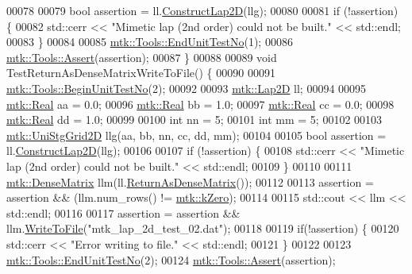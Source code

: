 \begin{DoxyCode}
00078 
00079   \textcolor{keywordtype}{bool} assertion = ll.\hyperlink{classmtk_1_1Lap2D_a188ee8fee643463affca7de2884711b1}{ConstructLap2D}(llg);
00080 
00081   \textcolor{keywordflow}{if} (!assertion) \{
00082     std::cerr << \textcolor{stringliteral}{"Mimetic lap (2nd order) could not be built."} << std::endl;
00083   \}
00084 
00085   \hyperlink{classmtk_1_1Tools_ad8cf0085133dd40c913fe195bc5b9694}{mtk::Tools::EndUnitTestNo}(1);
00086   \hyperlink{classmtk_1_1Tools_aa311fada9255627d06c56b1e4fedce9e}{mtk::Tools::Assert}(assertion);
00087 \}
00088 
00089 \textcolor{keywordtype}{void} TestReturnAsDenseMatrixWriteToFile() \{
00090 
00091   \hyperlink{classmtk_1_1Tools_a26ee906d28523378522a75e25c3a4e19}{mtk::Tools::BeginUnitTestNo}(2);
00092 
00093   \hyperlink{classmtk_1_1Lap2D}{mtk::Lap2D} ll;
00094 
00095   \hyperlink{group__c01-roots_gac080bbbf5cbb5502c9f00405f894857d}{mtk::Real} aa = 0.0;
00096   \hyperlink{group__c01-roots_gac080bbbf5cbb5502c9f00405f894857d}{mtk::Real} bb = 1.0;
00097   \hyperlink{group__c01-roots_gac080bbbf5cbb5502c9f00405f894857d}{mtk::Real} cc = 0.0;
00098   \hyperlink{group__c01-roots_gac080bbbf5cbb5502c9f00405f894857d}{mtk::Real} dd = 1.0;
00099 
00100   \textcolor{keywordtype}{int} nn = 5;
00101   \textcolor{keywordtype}{int} mm = 5;
00102 
00103   \hyperlink{classmtk_1_1UniStgGrid2D}{mtk::UniStgGrid2D} llg(aa, bb, nn, cc, dd, mm);
00104 
00105   \textcolor{keywordtype}{bool} assertion = ll.\hyperlink{classmtk_1_1Lap2D_a188ee8fee643463affca7de2884711b1}{ConstructLap2D}(llg);
00106 
00107   \textcolor{keywordflow}{if} (!assertion) \{
00108     std::cerr << \textcolor{stringliteral}{"Mimetic lap (2nd order) could not be built."} << std::endl;
00109   \}
00110 
00111   \hyperlink{classmtk_1_1DenseMatrix}{mtk::DenseMatrix} llm(ll.\hyperlink{classmtk_1_1Lap2D_aaac0a22eaa2f036869b24fd420ce5761}{ReturnAsDenseMatrix}());
00112 
00113   assertion = assertion && (llm.num\_rows() != \hyperlink{group__c01-roots_ga59a451a5fae30d59649bcda274fea271}{mtk::kZero});
00114 
00115   std::cout << llm << std::endl;
00116 
00117   assertion = assertion && llm.\hyperlink{classmtk_1_1DenseMatrix_a783d5ea89262d4e2eeb14b9c1ecd0063}{WriteToFile}(\textcolor{stringliteral}{"mtk\_lap\_2d\_test\_02.dat"});
00118 
00119   \textcolor{keywordflow}{if}(!assertion) \{
00120     std::cerr << \textcolor{stringliteral}{"Error writing to file."} << std::endl;
00121   \}
00122 
00123   \hyperlink{classmtk_1_1Tools_ad8cf0085133dd40c913fe195bc5b9694}{mtk::Tools::EndUnitTestNo}(2);
00124   \hyperlink{classmtk_1_1Tools_aa311fada9255627d06c56b1e4fedce9e}{mtk::Tools::Assert}(assertion);

\end{DoxyCode}

